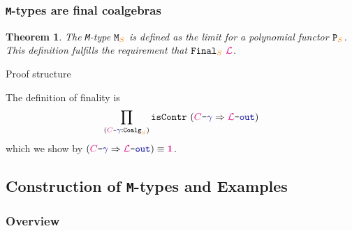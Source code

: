 \documentclass[xelatex,mathserif,serif,notheorems]{beamer} %
\theoremstyle{plain} %
\newtheorem{thm}{Theorem}[section]
\theoremstyle{definition}
\theoremstyle{remark}
\newcommand*{\type}[1]{\textcolor{magenta!90!black}{#1}}
\newcommand*{\container}[1]{\textcolor{orange}{#1}}
\newcommand*{\unit}{\type{\textbf{1}}}
\newcommand*{\coalg}[2]{#1\texttt{-}#2}
\newcommand*{\function}[1]{\textcolor{blue!60!black}{\ensuremath{\mathtt{#1}}}}
\newcommand*{\typeformer}[1]{\ensuremath{\mathtt{#1}}}
\newcommand*{\functor}[1]{\ensuremath{\mathbf{\mathtt{#1}}}}
\newcommand{\setlengths}{
  \setlength{\abovedisplayskip}{4pt}
  \setlength{\belowdisplayskip}{4pt}
  \setlength{\abovedisplayshortskip}{2pt}
  \setlength{\belowdisplayshortskip}{2pt}
}
\begin{document}
\begin{frame}
  \frametitle{\texttt{M}-types are final coalgebras}
  \begin{thm}\setlengths
    The \texttt{M}-type \(\typeformer{M}_{\container{S}}\) is defined as the limit for a polynomial functor \(\functor{P}_{\container{S}}\). This definition fulfills the requirement that \(\typeformer{Final}_{\container{S}}~\type{\mathcal{L}}\).
  \end{thm}
  \begin{block}{Proof structure}\setlengths
    The definition of finality is
    \begin{equation}
      \prod_{(\coalg{\type{C}}{\function{\gamma}} : \mathtt{Coalg}_{\container{S}})} \mathtt{isContr}~(\coalg{\type{C}}{\function{\gamma}} \Rightarrow \coalg{\type{\mathcal{L}}}{\function{out}})
    \end{equation}
    which we show by \((\coalg{\type{C}}{\function{\gamma}} \Rightarrow \coalg{\type{\mathcal{L}}}{\function{out}}) \equiv \unit\).
  \end{block}
\end{frame}

\subsection{Construction of \texttt{M}-types and Examples}
\begin{frame}
  \frametitle{Overview}
  \tableofcontents[currentsubsection]
\end{frame}
\end{document}

